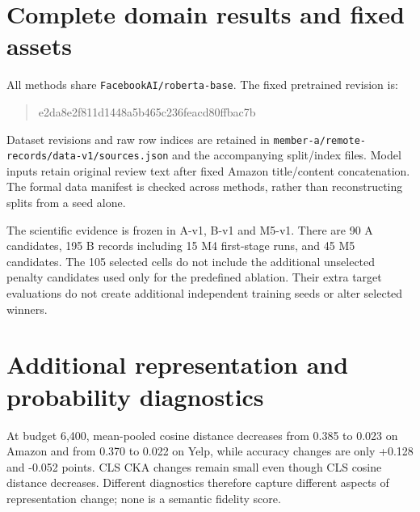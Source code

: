 \documentclass[a4paper,10pt]{article}
\begin{document}
\clearpage
\appendix
\section{Complete domain results and fixed assets}\label{app:domains}
\begin{center}

\end{center}
All methods share \texttt{FacebookAI/roberta-base}. The fixed pretrained revision is:
\begin{quote}\ttfamily e2da8e2f811d1448a5b465c236feacd80ffbac7b\end{quote}
Dataset revisions and raw row indices are retained in \nolinkurl{member-a/remote-records/data-v1/sources.json} and the accompanying split/index files. Model inputs retain original review text after fixed Amazon title/content concatenation. The formal data manifest is checked across methods, rather than reconstructing splits from a seed alone.

The scientific evidence is frozen in A-v1, B-v1 and M5-v1. There are 90 A candidates, 195 B records including 15 M4 first-stage runs, and 45 M5 candidates. The 105 selected cells do not include the additional unselected penalty candidates used only for the predefined ablation. Their extra target evaluations do not create additional independent training seeds or alter selected winners.

\clearpage
\section{Additional representation and probability diagnostics}\label{app:diagnostics}
\begin{center}

\end{center}
At budget 6,400, mean-pooled cosine distance decreases from 0.385 to 0.023 on Amazon and from 0.370 to 0.022 on Yelp, while accuracy changes are only +0.128 and -0.052 points. CLS CKA changes remain small even though CLS cosine distance decreases. Different diagnostics therefore capture different aspects of representation change; none is a semantic fidelity score.
\end{document}
